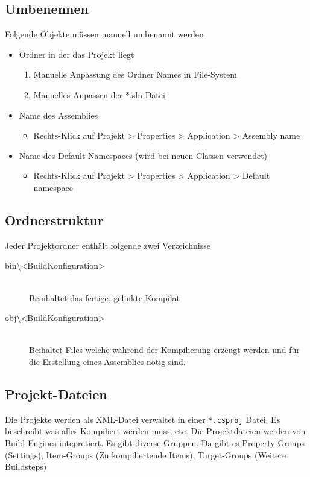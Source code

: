 \documentclass[
a4paper,
oneside,
10pt,
fleqn,
headsepline,
toc=listofnumbered, 
bibliography=totocnumbered]{scrartcl}
\begin{document}
\subsection{Umbenennen}
Folgende Objekte müssen manuell umbenannt werden
\begin{itemize}
	\item Ordner in der das Projekt liegt
	      \begin{enumerate}
		      \item Manuelle Anpassung des Ordner Names in File-System
		      \item  Manuelles Anpassen der *.sln-Datei
	      \end{enumerate}
	\item Name des Assemblies
	      \begin{itemize}
		      \item Rechts-Klick auf Projekt > Properties > Application > Assembly name
	      \end{itemize}
	\item Name des Default Namespaces (wird bei neuen Classen verwendet)
	      \begin{itemize}
		      \item Rechts-Klick auf Projekt > Properties > Application > Default namespace
	      \end{itemize}
\end{itemize}

\subsection{Ordnerstruktur}
Jeder Projektordner enthält folgende zwei Verzeichnisse
\begin{description}
	\item[bin\textbackslash<BuildKonfiguration>] \hfill \\
		Beinhaltet das fertige, gelinkte Kompilat
	\item[obj\textbackslash<BuildKonfiguration>] \hfill \\
		Beihaltet Files welche während der Kompilierung erzeugt werden und für die Erstellung eines Assemblies nötig sind.
\end{description}

\subsection{Projekt-Dateien}
Die Projekte werden als XML-Datei verwaltet in einer \lstinline|*.csproj| Datei. Es beschreibt was alles Kompiliert werden muss, etc. Die Projektdateien werden von Build Engines intepretiert. Es gibt diverse Gruppen. Da gibt es Property-Groups (Settings), Item-Groups (Zu kompiliertende Items), Target-Groups (Weitere Buildsteps)
\end{document}
